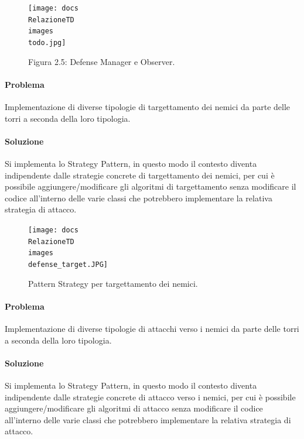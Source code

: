 \documentclass[a4paper,12pt]{report}
\begin{document}
\begin{figure}[H]
    \centering
    \texttt{[image: docs\\RelazioneTD\\images\\todo.jpg]}
    \caption{Figura 2.5: Defense Manager e Observer.}
    \label{fig:defense-observer}
\end{figure}

\vspace{50mm}

\paragraph{Problema}
Implementazione di diverse tipologie di targettamento dei nemici da parte delle torri a seconda della loro tipologia.
\paragraph{Soluzione}
Si implementa lo Strategy Pattern, in questo modo il contesto diventa indipendente dalle strategie concrete di targettamento dei nemici, per cui è possibile aggiungere/modificare gli algoritmi di targettamento senza modificare il codice all'interno delle varie classi che potrebbero implementare la relativa strategia di attacco.

\begin{figure}[H]
    \centering
    \texttt{[image: docs\\RelazioneTD\\images\\defense\_target.JPG]}
    \caption{Pattern Strategy per targettamento dei nemici.}
    \label{fig:defense_target}
\end{figure}

\vspace{70mm}

\paragraph{Problema}
Implementazione di diverse tipologie di attacchi verso i nemici da parte delle torri a seconda della loro tipologia.
\paragraph{Soluzione}
Si implementa lo Strategy Pattern, in questo modo il contesto diventa indipendente dalle strategie concrete di attacco verso i nemici, per cui è possibile aggiungere/modificare gli algoritmi di attacco senza modificare il codice all'interno delle varie classi che potrebbero implementare la relativa strategia di attacco.
\end{document}
